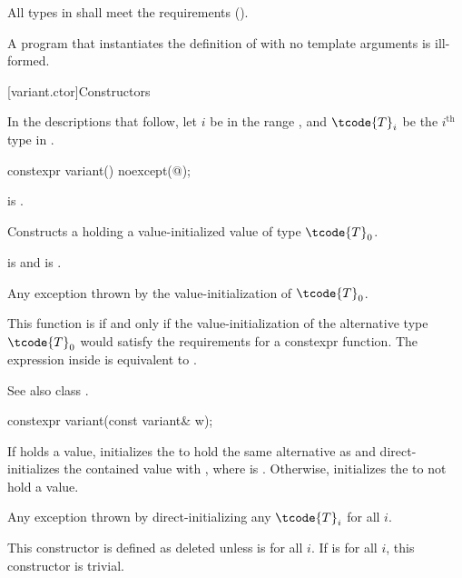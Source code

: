 \pnum
All types in  shall meet
the  requirements ().

\pnum
A program that instantiates the definition of  with
no template arguments is ill-formed.

[variant.ctor]{Constructors}

\pnum
In the descriptions that follow, let $i$ be in the range ,
and $\tcode{T}_i$ be the $i^\text{th}$ type in .

%
\begin{itemdecl}
constexpr variant() noexcept(@\seebelow@);
\end{itemdecl}

\begin{itemdescr}
\pnum
\constraints
{} is .

\pnum
\effects
Constructs a  holding a value-initialized value of type $\tcode{T}_0$.

\pnum
\ensures
{} is  and  is .

\pnum
\throws
Any exception thrown by the value-initialization of $\tcode{T}_0$.

\pnum
\remarks
This function is  if and only if the
value-initialization of the alternative type $\tcode{T}_0$ would satisfy the
requirements for a constexpr function.
The expression inside  is equivalent to
.
\begin{note}
See also class .
\end{note}
\end{itemdescr}

%
\begin{itemdecl}
constexpr variant(const variant& w);
\end{itemdecl}

\begin{itemdescr}
\pnum
\effects
If  holds a value, initializes the  to hold the same
alternative as  and direct-initializes the contained value
with , where  is .
Otherwise, initializes the  to not hold a value.

\pnum
\throws
Any exception thrown by direct-initializing any $\tcode{T}_i$ for all $i$.

\pnum
\remarks
This constructor is defined as deleted unless
 is  for all $i$.
If 
is  for all $i$, this constructor is trivial.
\end{itemdescr}

